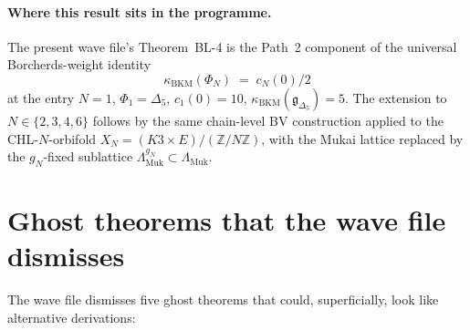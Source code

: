\paragraph{Where this result sits in the programme.}
The present wave file's Theorem~BL-4 is the Path~2 component of the
universal Borcherds-weight identity
\begin{equation*}
 \kappa_{\mathrm{BKM}}(\Phi_N) \;=\; c_N(0)/2
\end{equation*}
at the entry $N = 1$, $\Phi_1 = \Delta_5$, $c_1(0) = 10$,
$\kappa_{\mathrm{BKM}}(\mathfrak{g}_{\Delta_5}) = 5$. The extension to
$N \in \{2, 3, 4, 6\}$ follows by the same chain-level BV construction
applied to the CHL-$N$-orbifold $X_N = (K3 \times E)/(\mathbb{Z}/N\mathbb{Z})$,
with the Mukai lattice replaced by the $g_N$-fixed sublattice
$\Lambda^{g_N}_{\mathrm{Muk}} \subset \Lambda_{\mathrm{Muk}}$.

\section*{Ghost theorems that the wave file dismisses}

The wave file dismisses five ghost theorems that could, superficially,
look like alternative derivations:


